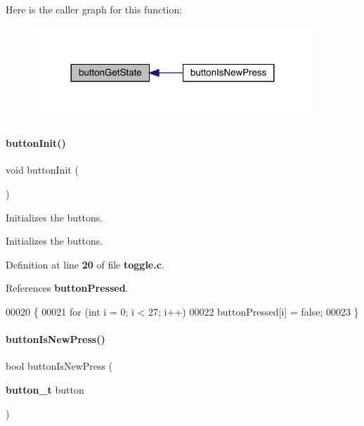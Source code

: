 Here is the caller graph for this function\+:\nopagebreak
\begin{figure}[H]
\begin{center}
\leavevmode
\includegraphics[width=296pt]{toggle_8h_a72989c21af9d14672f6e59c44a2b59bc_icgraph}
\end{center}
\end{figure}
\mbox{\label{toggle_8h_a2b3d226371575c894979ab84bce95626}} 
\paragraph{button\+Init()}
{\footnotesize\ttfamily void button\+Init (\begin{DoxyParamCaption}{ }\end{DoxyParamCaption})}



Initializes the buttons. 

Initializes the buttons. 

Definition at line \textbf{ 20} of file \textbf{ toggle.\+c}.



References \textbf{ button\+Pressed}.


\begin{DoxyCode}
00020                   \{
00021     \textcolor{keywordflow}{for} (\textcolor{keywordtype}{int} i = 0; i < 27; i++)
00022         buttonPressed[i] = \textcolor{keyword}{false};
00023 \}
\end{DoxyCode}
\mbox{\label{toggle_8h_ae819f86fad1b51d66f4294140b53ff77}} 
\paragraph{button\+Is\+New\+Press()}
{\footnotesize\ttfamily bool button\+Is\+New\+Press (\begin{DoxyParamCaption}\item[{\textbf{ button\+\_\+t}}]{button }\end{DoxyParamCaption})}



